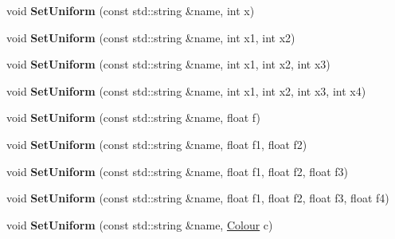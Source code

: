 \begin{DoxyCompactItemize}
\item 
void {\bfseries Set\+Uniform} (const std\+::string \&name, int x)\hypertarget{classpangolin_1_1_gl_sl_program_a5731be2af6fa53c17cfb35088b95a601}{}\label{classpangolin_1_1_gl_sl_program_a5731be2af6fa53c17cfb35088b95a601}

\item 
void {\bfseries Set\+Uniform} (const std\+::string \&name, int x1, int x2)\hypertarget{classpangolin_1_1_gl_sl_program_a3ca25f615d97242871d658bb6a1e4992}{}\label{classpangolin_1_1_gl_sl_program_a3ca25f615d97242871d658bb6a1e4992}

\item 
void {\bfseries Set\+Uniform} (const std\+::string \&name, int x1, int x2, int x3)\hypertarget{classpangolin_1_1_gl_sl_program_a63d941f091d09c131ed38d93c1349a72}{}\label{classpangolin_1_1_gl_sl_program_a63d941f091d09c131ed38d93c1349a72}

\item 
void {\bfseries Set\+Uniform} (const std\+::string \&name, int x1, int x2, int x3, int x4)\hypertarget{classpangolin_1_1_gl_sl_program_acac7526f33948068f3e2fe3cd57abacc}{}\label{classpangolin_1_1_gl_sl_program_acac7526f33948068f3e2fe3cd57abacc}

\item 
void {\bfseries Set\+Uniform} (const std\+::string \&name, float f)\hypertarget{classpangolin_1_1_gl_sl_program_a5db8cb062b0e0590c2ac5c20e2f7d7f1}{}\label{classpangolin_1_1_gl_sl_program_a5db8cb062b0e0590c2ac5c20e2f7d7f1}

\item 
void {\bfseries Set\+Uniform} (const std\+::string \&name, float f1, float f2)\hypertarget{classpangolin_1_1_gl_sl_program_a7ec9ea99220ddb382a04d461aa15ab28}{}\label{classpangolin_1_1_gl_sl_program_a7ec9ea99220ddb382a04d461aa15ab28}

\item 
void {\bfseries Set\+Uniform} (const std\+::string \&name, float f1, float f2, float f3)\hypertarget{classpangolin_1_1_gl_sl_program_ae3515f491cec31186996ee0d96c133f8}{}\label{classpangolin_1_1_gl_sl_program_ae3515f491cec31186996ee0d96c133f8}

\item 
void {\bfseries Set\+Uniform} (const std\+::string \&name, float f1, float f2, float f3, float f4)\hypertarget{classpangolin_1_1_gl_sl_program_a7b61e3c3986d934af45dca4b195aaca7}{}\label{classpangolin_1_1_gl_sl_program_a7b61e3c3986d934af45dca4b195aaca7}

\item 
void {\bfseries Set\+Uniform} (const std\+::string \&name, \hyperlink{structpangolin_1_1_colour}{Colour} c)\hypertarget{classpangolin_1_1_gl_sl_program_a77ede6406251fccc92ec635434a3b4ad}{}\label{classpangolin_1_1_gl_sl_program_a77ede6406251fccc92ec635434a3b4ad}


\end{DoxyCompactItemize}
